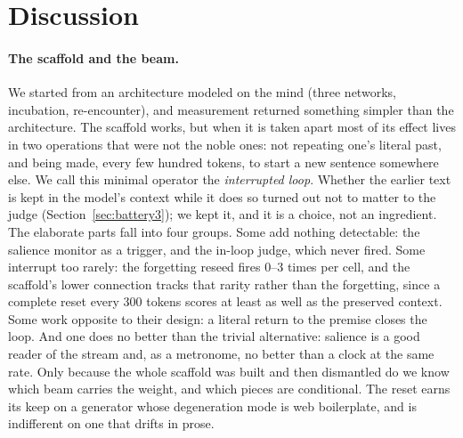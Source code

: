 \section{Discussion}
\label{sec:discussion}

\paragraph{The scaffold and the beam.} We started from an architecture
modeled on the mind (three networks, incubation, re-encounter), and
measurement returned something simpler than the architecture. The scaffold
works, but when it is taken apart most of its effect lives in two
operations that were not the noble ones: not repeating one's literal past,
and being made, every few hundred tokens, to start a new sentence somewhere
else. We call this minimal operator the \emph{interrupted loop}. Whether the
earlier text is kept in the model's context while it does so turned out not
to matter to the judge (Section~\ref{sec:battery3}); we kept it, and it is a
choice, not an ingredient. The elaborate parts fall into four groups. Some
add nothing detectable: the salience monitor as a trigger, and the in-loop
judge, which never fired. Some interrupt too rarely: the forgetting reseed
fires 0--3 times per cell, and the scaffold's lower connection tracks that
rarity rather than the forgetting, since a complete reset every 300 tokens
scores at least as well as the preserved context. Some work opposite to
their design: a literal return to the premise closes the loop. And one does
no better than the trivial alternative: salience is a good reader of the
stream and, as a metronome, no better than a clock at the same rate. Only
because the whole scaffold was built and then dismantled do we know which
beam carries the weight, and which pieces are conditional. The reset earns
its keep on a generator whose degeneration mode is web boilerplate, and is
indifferent on one that drifts in prose.

